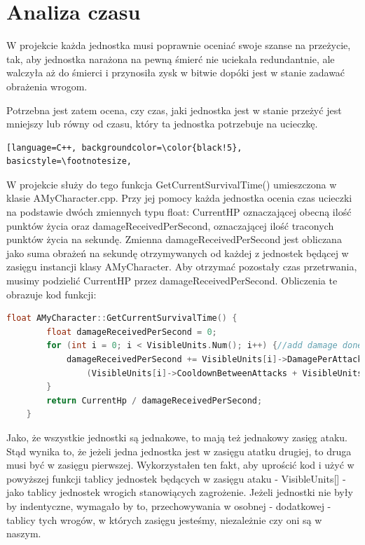 \documentclass[12pt]{report}
\begin{document}
\section{Analiza czasu}
W projekcie każda jednostka musi poprawnie oceniać swoje szanse na przeżycie, tak, aby jednostka narażona na pewną śmierć nie uciekała redundantnie, ale walczyła aż do śmierci i przynosiła zysk w bitwie dopóki jest w stanie zadawać obrażenia wrogom.

Potrzebna jest zatem ocena, czy czas, jaki jednostka jest w stanie przeżyć jest mniejszy lub równy od czasu, który ta jednostka potrzebuje na ucieczkę.

\begin{lstlisting}[language=C++, backgroundcolor=\color{black!5}, basicstyle=\footnotesize, 

\end{lstlisting}


W projekcie służy do tego funkcja GetCurrentSurvivalTime() umieszczona w klasie AMyCharacter.cpp. Przy jej pomocy każda jednostka ocenia czas ucieczki na podstawie dwóch zmiennych typu float: CurrentHP oznaczającej obecną ilość punktów życia oraz damageReceivedPerSecond, oznaczającej ilość traconych punktów życia na sekundę. Zmienna damageReceivedPerSecond jest obliczana jako suma obrażeń na sekundę otrzymywanych od każdej z jednostek będącej w zasięgu instancji klasy AMyCharacter. Aby otrzymać pozostały czas przetrwania, musimy podzielić CurrentHP przez damageReceivedPerSecond. Obliczenia te obrazuje kod funkcji:

\begin{lstlisting}[language=C++, backgroundcolor=\color{black!5}, basicstyle=\footnotesize, caption=Funkcja GetCurrentSurvivalTime w klasie AMyCharacter.cpp.]
    float AMyCharacter::GetCurrentSurvivalTime() {
		float damageReceivedPerSecond = 0;
		for (int i = 0; i < VisibleUnits.Num(); i++) {//add damage done by single unit to sum, all given values are in seconds
			damageReceivedPerSecond += VisibleUnits[i]->DamagePerAttack /
				(VisibleUnits[i]->CooldownBetweenAttacks + VisibleUnits[i]->AttackDuration);
		}
		return CurrentHp / damageReceivedPerSecond;
	}
\end{lstlisting}

Jako, że wszystkie jednostki są jednakowe, to mają też jednakowy zasięg ataku. Stąd wynika to, że jeżeli jedna jednostka jest w zasięgu atatku drugiej, to druga musi być w zasięgu pierwszej. Wykorzystałen ten fakt, aby uprościć kod i użyć w powyższej funkcji tablicy jednostek będących w zasięgu ataku - VisibleUnits[] - jako tablicy jednostek wrogich stanowiących zagrożenie. Jeżeli jednostki nie były by indentyczne, wymagało by to, przechowywania w osobnej - dodatkowej - tablicy tych wrogów, w których zasięgu jesteśmy, niezależnie czy oni są w naszym.
\end{document}
